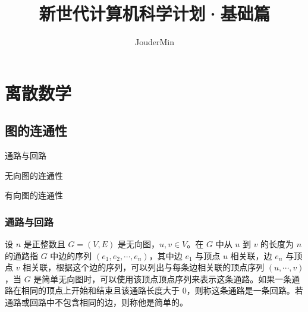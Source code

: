 \documentclass[lang=cn, thmcnt=section, chinesefont=founder, color=cyan, citestyle=gb7714-2015, bibstyle=gb7714-2015]{elegantbook}
\title{新世代计算机科学计划·基础篇}
\author{JouderMin}
\institute{「新世代计算机科学计划」制作委员会}
\date{\zhtoday}
\begin{document}
\maketitle
\frontmatter

\tableofcontents

\mainmatter

\chapter{离散数学}





\section{图的连通性}
\begin{introduction}
    \item 通路与回路
    \item 无向图的连通性
    \item 有向图的连通性
\end{introduction}

\subsection{通路与回路}

\begin{definition}[无向图的通路与回路]\label{def:无向图的通路与回路}
    设 $n$ 是正整数且 $G=(V,E)$ 是无向图，$u,v \in V$。在 $G$ 中从 $u$ 到 $v$ 的长度为 $n$ 的通路指 $G$ 中边的序列 $(e_1,e_2,\cdots,e_n)$，其中边 $e_1$ 与顶点 $u$ 相关联，边 $e_n$ 与顶点 $v$ 相关联，根据这个边的序列，可以列出与每条边相关联的顶点序列 $(u,\cdots,v)$，当 $G$ 是简单无向图时，可以使用该顶点顶点序列来表示这条通路。如果一条通路在相同的顶点上开始和结束且该通路长度大于 $0$，则称这条通路是一条回路。若通路或回路中不包含相同的边，则称他是简单的。
\end{definition}
\end{document}
